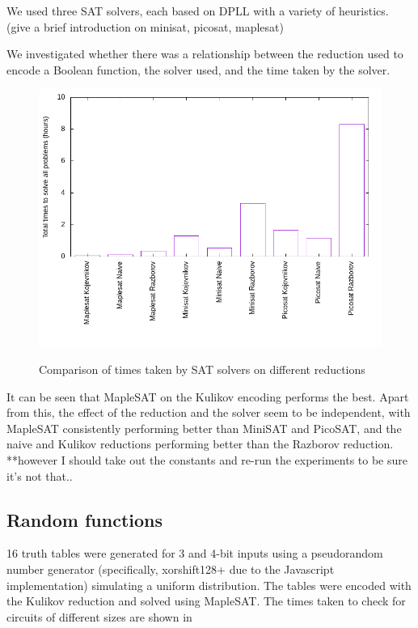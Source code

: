 \documentclass{article}
\begin{document}
We used three SAT solvers, each based on DPLL with a variety of heuristics. (give a brief introduction on minisat, picosat, maplesat)

We investigated whether there was a relationship between the reduction used to encode a Boolean function, the solver used, and the time taken by the solver.

\begin{figure}[!ht]
  \includegraphics[width=\textwidth]{images/totals.png}
  \label{fig:totals}
  \caption{Comparison of times taken by SAT solvers on different reductions}

\end{figure}

It can be seen that MapleSAT on the Kulikov encoding performs the best. Apart from this, the effect of the reduction and the solver seem to be independent, with MapleSAT consistently performing better than MiniSAT and PicoSAT, and the naive and Kulikov reductions performing better than the Razborov reduction. **however I should take out the constants and re-run the experiments to be sure it’s not that..

\subsection{Random functions}

16 truth tables were generated for 3 and 4-bit inputs using a pseudorandom number generator (specifically, xorshift128+ due to the Javascript implementation) simulating a uniform distribution. The tables were encoded with the Kulikov reduction and solved using MapleSAT. The times taken to check for circuits of different sizes are shown in
\end{document}
